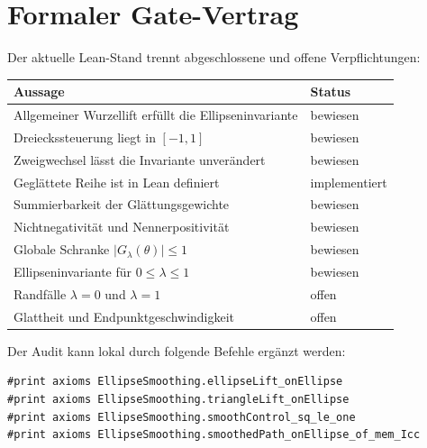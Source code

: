 \section{Formaler Gate-Vertrag}

Der aktuelle Lean-Stand trennt abgeschlossene und offene Verpflichtungen:

\begin{center}
\begin{tabular}{p{}p{}}
\toprule
Aussage & Status \\
\midrule
Allgemeiner Wurzellift erfüllt die Ellipseninvariante & bewiesen \\
Dreieckssteuerung liegt in $[-1,1]$ & bewiesen \\
Zweigwechsel lässt die Invariante unverändert & bewiesen \\
Geglättete Reihe ist in Lean definiert & implementiert \\
Summierbarkeit der Glättungsgewichte & bewiesen \\
Nichtnegativität und Nennerpositivität & bewiesen \\
Globale Schranke $\lvert G_\lambda(\theta)\rvert\leq1$ & bewiesen \\
Ellipseninvariante für $0\leq\lambda\leq1$ & bewiesen \\
Randfälle $\lambda=0$ und $\lambda=1$ & offen \\
Glattheit und Endpunktgeschwindigkeit & offen \\
\bottomrule
\end{tabular}
\end{center}

Der Audit kann lokal durch folgende Befehle ergänzt werden:

\begin{lstlisting}
#print axioms EllipseSmoothing.ellipseLift_onEllipse
#print axioms EllipseSmoothing.triangleLift_onEllipse
#print axioms EllipseSmoothing.smoothControl_sq_le_one
#print axioms EllipseSmoothing.smoothedPath_onEllipse_of_mem_Icc
\end{lstlisting}
